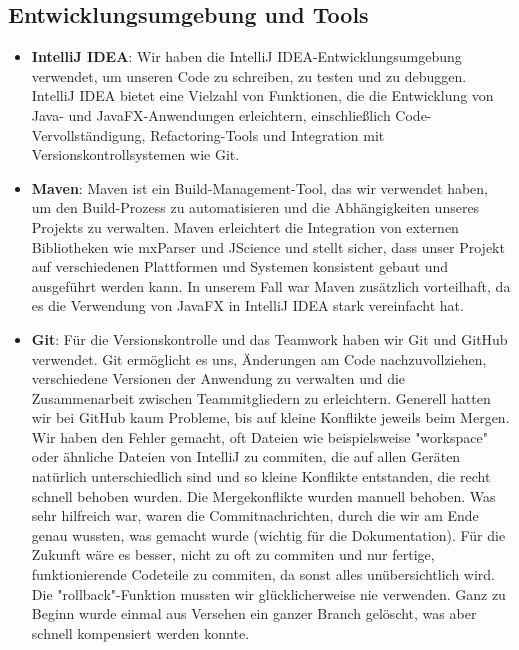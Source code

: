 \documentclass[a4paper]{article}
\begin{document}
\subsection{Entwicklungsumgebung und Tools}

\begin{itemize}
	\item \textbf{IntelliJ IDEA}: Wir haben die IntelliJ IDEA-Entwicklungsumgebung verwendet, um unseren Code zu schreiben, zu testen und zu debuggen. IntelliJ IDEA bietet eine Vielzahl von Funktionen, die die Entwicklung von Java- und JavaFX-Anwendungen erleichtern, einschließlich Code-Vervollständigung, Refactoring-Tools und Integration mit Versionskontrollsystemen wie Git.

	\item \textbf{Maven}: Maven ist ein Build-Management-Tool, das wir verwendet haben, um den Build-Prozess zu automatisieren und die Abhängigkeiten unseres Projekts zu verwalten. Maven erleichtert die Integration von externen Bibliotheken wie mxParser und JScience und stellt sicher, dass unser Projekt auf verschiedenen Plattformen und Systemen konsistent gebaut und ausgeführt werden kann. In unserem Fall war Maven zusätzlich vorteilhaft, da es die Verwendung von JavaFX in IntelliJ IDEA stark vereinfacht hat.

	\item \textbf{Git}: Für die Versionskontrolle und das Teamwork haben wir Git und GitHub verwendet. Git ermöglicht es uns, Änderungen am Code nachzuvollziehen, verschiedene Versionen der Anwendung zu verwalten und die Zusammenarbeit zwischen Teammitgliedern zu erleichtern. Generell hatten wir bei GitHub kaum Probleme, bis auf kleine Konflikte jeweils beim Mergen. Wir haben den Fehler gemacht, oft Dateien wie beispielsweise "workspace" oder ähnliche Dateien von IntelliJ zu commiten, die auf allen Geräten natürlich unterschiedlich sind und so kleine Konflikte entstanden, die recht schnell behoben wurden. Die Mergekonflikte wurden manuell behoben. Was sehr hilfreich war, waren die Commitnachrichten, durch die wir am Ende genau wussten, was gemacht wurde (wichtig für die Dokumentation). Für die Zukunft wäre es besser, nicht zu oft zu commiten und nur fertige, funktionierende Codeteile zu commiten, da sonst alles unübersichtlich wird. Die "rollback"-Funktion mussten wir glücklicherweise nie verwenden. Ganz zu Beginn wurde einmal aus Versehen ein ganzer Branch gelöscht, was aber schnell kompensiert werden konnte.
\end{itemize}
\end{document}
